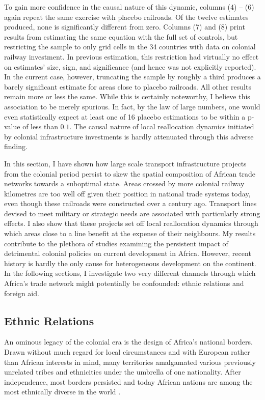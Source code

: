\documentclass[11pt, oneside]{article}   	%
\begin{document}
To gain more confidence in the causal nature of this dynamic, columns (4) -- (6) again repeat the same exercise with placebo railroads. Of the twelve estimates produced, none is significantly different from zero. Columns (7) and (8) print results from estimating the same equation with the full set of controls, but restricting the sample to only grid cells in the 34 countries with data on colonial railway investment. In previous estimation, this restriction had virtually no effect on estimates' size, sign, and significance (and hence was not explicitly reported). In the current case, however, truncating the sample by roughly a third produces a barely significant estimate for areas close to placebo railroads. All other results remain more or less the same. While this is certainly noteworthy, I believe this association to be merely spurious. In fact, by the law of large numbers, one would even statistically expect at least one of 16 placebo estimations to be within a p-value of less than $0.1$. The causal nature of local reallocation dynamics initiated by colonial infrastructure investments is hardly attenuated through this adverse finding.

In this section, I have shown how large scale transport infrastructure projects from the colonial period persist to skew the spatial composition of African trade networks towards a suboptimal state. Areas crossed by more colonial railway kilometres are too well off given their position in national trade systems today, even though these railroads were constructed over a century ago. Transport lines devised to meet military or strategic needs are associated with particularly strong effects. I also show that these projects set off local reallocation dynamics through which areas close to a line benefit at the expense of their neighbours. My results contribute to the plethora of studies examining the persistent impact of detrimental colonial policies on current development in Africa. However, recent history is hardly the only cause for heterogeneous development on the continent. In the following sections, I investigate two very different channels through which Africa's trade network might potentially be confounded: ethnic relations and foreign aid.

\subsection{Ethnic Relations}
An ominous legacy of the colonial era is the design of Africa's national borders. Drawn without much regard for local circumstances and with European rather than African interests in mind, many territories amalgamated various previously unrelated tribes and ethnicities under the umbrella of one nationality. After independence, most borders persisted and today African nations are among the most ethnically diverse in the world \citep{Alesina_Ethnicinequality_2016}.
\end{document}

